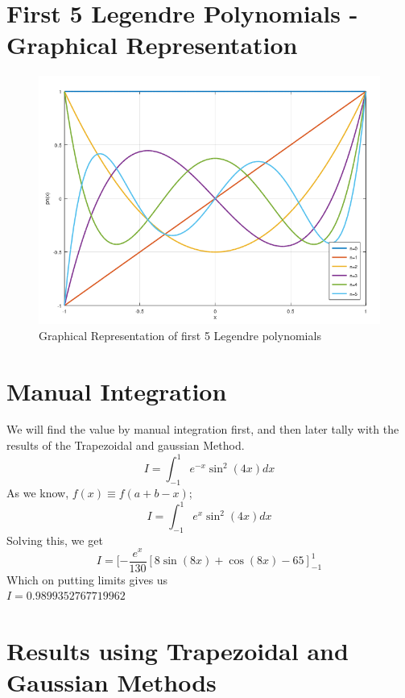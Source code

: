 \documentclass[12pt]{article}
\begin{document}
\section{First 5 Legendre Polynomials - Graphical Representation}
\begin{figure}[H]
    \centering
    \includegraphics[width=13cm]{5leg.png}
    \caption{Graphical Representation of first 5 Legendre polynomials}
\end{figure}

\section{Manual Integration}
We will find the value by manual integration first, and then later tally with the results of the Trapezoidal and gaussian Method.
\begin{equation*}
    I=\int_{-1}^{1} e^{-x} \sin ^{2}(4 x) d x
\end{equation*}
As we know, $f(x) \equiv f(a+b-x)$;
\begin{equation*}
    I=\int_{-1}^{1} e^{x} \sin ^{2}(4 x) d x
\end{equation*}
Solving this, we get 
\begin{equation*}
    I = [-\frac{e^{x}}{130}[8 \sin (8 x)+\cos (8 x)-65]^1_{-1}
\end{equation*}
Which on putting limits gives us \\
$I = 0.9899352767719962$

\section{Results using Trapezoidal and Gaussian Methods}
\end{document}
